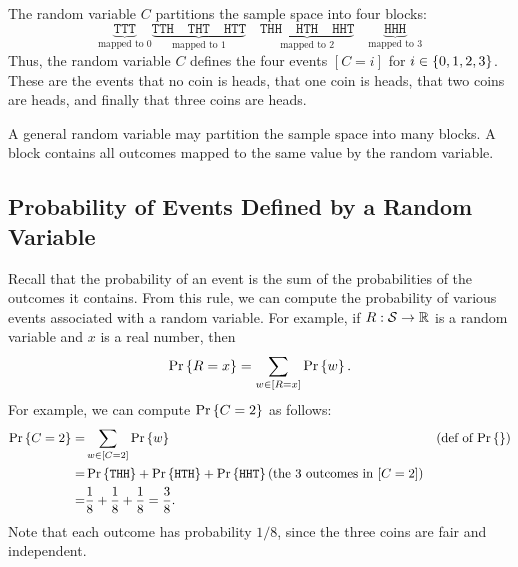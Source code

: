 \documentclass[11pt,twoside]{article}
\begin{document}
The random variable $C$ partitions the sample space into four blocks:
\[
\underbrace{\mathtt{TTT}}_{\mbox{mapped to 0}} 
\underbrace{\mathtt{TTH} \quad \mathtt{THT} \quad \mathtt{HTT}}_{\mbox{mapped to 1}} \quad
\underbrace{\mathtt{THH} \quad \mathtt{HTH} \quad \mathtt{HHT}}_{\mbox{mapped to 2}} \quad
\underbrace{\mathtt{HHH}}_{\mbox{mapped to 3}} 
\]
Thus, the random variable $C$ defines the four events $[C=i]$ for $i \in
\left\{0, 1, 2, 3\right\}$.  These are the events that no coin is heads, that one
coin is heads, that two coins are heads, and finally that three coins are
heads.

A general random variable may partition the sample space into many blocks.
A block contains all outcomes mapped to the same value by the random
variable.

\subsection{Probability of Events Defined by a Random Variable}

Recall that the probability of an event is the sum of the probabilities of
the outcomes it contains.  From this rule, we can compute the probability
of various events associated with a random variable.  For example, if $R :
\mathcal{S} \to \mathbb{R}$ is a random variable and $x$ is a real number, then
\begin{equation*}
\mathop{\textup{Pr}}\nolimits\left\{R = x\right\}  =  \sum_{w \in [R = x]} \mathop{\textup{Pr}}\nolimits\left\{w\right\}.
\end{equation*}
For example, we can compute $\mathop{\textup{Pr}}\nolimits\left\{C = 2\right\}$ as follows:
\begin{align*}
\mathop{\textup{Pr}}\nolimits\left\{C = 2\right\} = & \sum_{w \in [C = 2]} \mathop{\textup{Pr}}\nolimits\left\{w\right\} & \text{(def of $\mathop{\textup{Pr}}\nolimits\left\{\right\}$)}\\
           = & \mathop{\textup{Pr}}\nolimits\left\{\mathtt{THH}\right\} + \mathop{\textup{Pr}}\nolimits\left\{\mathtt{HTH}\right\}
               + \mathop{\textup{Pr}}\nolimits\left\{\mathtt{HHT}\right\} \text{(the 3 outcomes in $[C=2]$)}\\
           = & \frac{1}{8} + \frac{1}{8} + \frac{1}{8} = \frac{3}{8}.
\end{align*}
Note that each outcome has probability $1/8$, since the three coins are
fair and independent.
\end{document}
